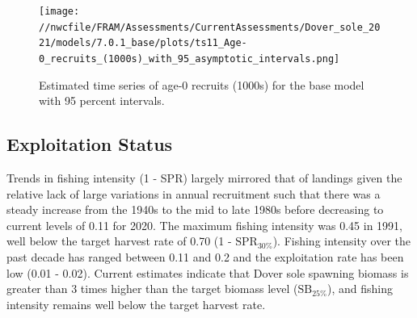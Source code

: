 \documentclass[11pt,
  english,
  a4paper,
]{article}
\begin{document}
\leavevmode\tagmcend\tagstructend\par




\begin{figure}
\centering
\texttt{[image: //nwcfile/FRAM/Assessments/CurrentAssessments/Dover\_sole\_2021/models/7.0.1\_base/plots/ts11\_Age-0\_recruits\_(1000s)\_with\_95\_asymptotic\_intervals.png]}
\caption{Estimated time series of age-0 recruits (1000s) for the base model with 95 percent intervals.\label{fig:es-recruits}}
\end{figure}

\tagmcend\tagstructend

\clearpage


\hypertarget{exploitation-status}{%
\subsection*{Exploitation Status}\label{exploitation-status}}

\leavevmode\tagmcend\tagstructend


Trends in fishing intensity (1 - SPR) largely mirrored that of landings given the relative lack of large variations in annual recruitment such that there was a steady increase from the 1940s to the mid to late 1980s before decreasing to current levels of 0.11 for 2020. The maximum fishing intensity was 0.45 in 1991, well below the target harvest rate of 0.70 (1 - {\(\text{SPR}_{30\%}\)\leavevmode\tagmcend\tagstructend}). Fishing intensity over the past decade has ranged between 0.11 and 0.2 and the exploitation rate has been low (0.01 - 0.02). Current estimates indicate that Dover sole spawning biomass is greater than 3 times higher than the target biomass level ({\(\text{SB}_{25\%}\)\leavevmode\tagmcend\tagstructend}), and fishing intensity remains well below the target harvest rate.

\leavevmode\tagmcend\tagstructend\par
\end{document}

